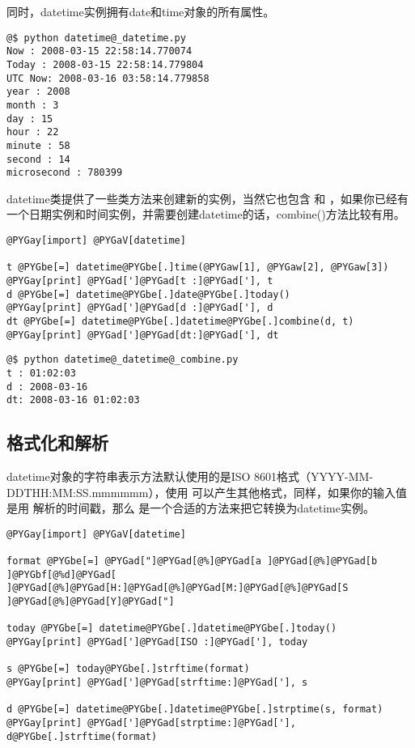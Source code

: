 \documentclass[a4paper,10pt,english]{manual}
\begin{document}
同时，datetime实例拥有date和time对象的所有属性。

\begin{Verbatim}[commandchars=@\[\]]
@$ python datetime@_datetime.py
Now : 2008-03-15 22:58:14.770074
Today : 2008-03-15 22:58:14.779804
UTC Now: 2008-03-16 03:58:14.779858
year : 2008
month : 3
day : 15
hour : 22
minute : 58
second : 14
microsecond : 780399
\end{Verbatim}

datetime类提供了一些类方法来创建新的实例，当然它也包含  和  ，如果你已经有一个日期实例和时间实例，并需要创建datetime的话，combine()方法比较有用。

\begin{Verbatim}[commandchars=@\[\]]
@PYGay[import] @PYGaV[datetime]

t @PYGbe[=] datetime@PYGbe[.]time(@PYGaw[1], @PYGaw[2], @PYGaw[3])
@PYGay[print] @PYGad[']@PYGad[t :]@PYGad['], t
d @PYGbe[=] datetime@PYGbe[.]date@PYGbe[.]today()
@PYGay[print] @PYGad[']@PYGad[d :]@PYGad['], d
dt @PYGbe[=] datetime@PYGbe[.]datetime@PYGbe[.]combine(d, t)
@PYGay[print] @PYGad[']@PYGad[dt:]@PYGad['], dt
\end{Verbatim}

\begin{Verbatim}[commandchars=@\[\]]
@$ python datetime@_datetime@_combine.py
t : 01:02:03
d : 2008-03-16
dt: 2008-03-16 01:02:03
\end{Verbatim}


\subsection{格式化和解析}

datetime对象的字符串表示方法默认使用的是ISO 8601格式（YYYY-MM-DDTHH:MM:SS.mmmmmm），使用  可以产生其他格式，同样，如果你的输入值是用  解析的时间戳，那么  是一个合适的方法来把它转换为datetime实例。

\begin{Verbatim}[commandchars=@\[\]]
@PYGay[import] @PYGaV[datetime]

format @PYGbe[=] @PYGad["]@PYGad[@%]@PYGad[a ]@PYGad[@%]@PYGad[b ]@PYGbf[@%d]@PYGad[ ]@PYGad[@%]@PYGad[H:]@PYGad[@%]@PYGad[M:]@PYGad[@%]@PYGad[S ]@PYGad[@%]@PYGad[Y]@PYGad["]

today @PYGbe[=] datetime@PYGbe[.]datetime@PYGbe[.]today()
@PYGay[print] @PYGad[']@PYGad[ISO :]@PYGad['], today

s @PYGbe[=] today@PYGbe[.]strftime(format)
@PYGay[print] @PYGad[']@PYGad[strftime:]@PYGad['], s

d @PYGbe[=] datetime@PYGbe[.]datetime@PYGbe[.]strptime(s, format)
@PYGay[print] @PYGad[']@PYGad[strptime:]@PYGad['], d@PYGbe[.]strftime(format)
\end{Verbatim}
\end{document}
